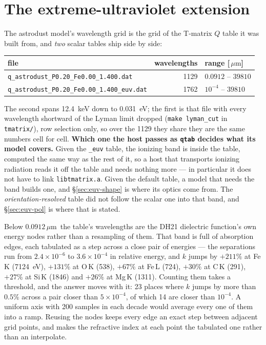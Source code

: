 \documentclass{my_memo}
\newcommand{\code}[1]{\texttt{#1}}
\newcommand{\um}{\ensuremath{\,\mu\mathrm{m}}}
\begin{document}
\section{The extreme-ultraviolet extension}\label{sec:euv}

The astrodust model's wavelength grid is the grid of the T-matrix $Q$ table it
was built from, and \emph{two} scalar tables ship side by side:
\begin{center}
\begin{tabular}{lrl}
\hline
file & wavelengths & range [\um] \\
\hline
\code{q\_astrodust\_P0.20\_Fe0.00\_1.400.dat}     & 1129 & $0.0912$ -- $39810$ \\
\code{q\_astrodust\_P0.20\_Fe0.00\_1.400\_euv.dat} & 1762 & $10^{-4}$ -- $39810$ \\
\hline
\end{tabular}
\end{center}
The second spans \SI{12.4}{\kilo\electronvolt} down to
\SI{0.031}{\electronvolt}; the first is that file with every wavelength
shortward of the Lyman limit dropped (\code{make lyman\_cut} in
\code{tmatrix/}), row selection only, so over the 1129 they share they are the
same numbers cell for cell. \textbf{Which one the host passes as \code{qtab}
decides what its model covers.} Given the \code{\_euv} table, the ionizing band
is inside the table, computed the same way as the rest of it, so a host that
transports ionizing radiation reads it off the table and needs nothing more ---
in particular it does not have to link \code{libtmatrix.a}. Given the default
table, a model that needs the band builds one, and \S\ref{sec:euv-shape} is
where its optics come from. The
\emph{orientation-resolved} table did not follow the scalar one into that
band, and \S\ref{sec:euv-pol} is where that is stated.

Below $0.0912$\um\ the table's wavelengths are the DH21 dielectric function's own
energy nodes rather than a resampling of them. That band is full of absorption
edges, each tabulated as a step across a close pair of energies --- the
separations run from $2.4\times10^{-6}$ to $3.6\times10^{-4}$ in relative
energy, and $k$ jumps by $+211\%$ at Fe\,K (\SI{7124}{\electronvolt}), $+131\%$
at O\,K (538), $+67\%$ at Fe\,L (724), $+30\%$ at C\,K (291), $+27\%$ at Si\,K
(1846) and $+26\%$ at Mg\,K (1311). Counting them takes a threshold, and the
answer moves with it: 23 places where $k$ jumps by more than $0.5\%$ across a
pair closer than $5\times10^{-4}$, of which 14 are closer than $10^{-4}$. A
uniform axis with 200 samples in each decade would average every one of them into a ramp.
Reusing the nodes
keeps every edge an exact step between adjacent grid points, and makes the
refractive index at each point the tabulated one rather than an interpolate.
\end{document}
